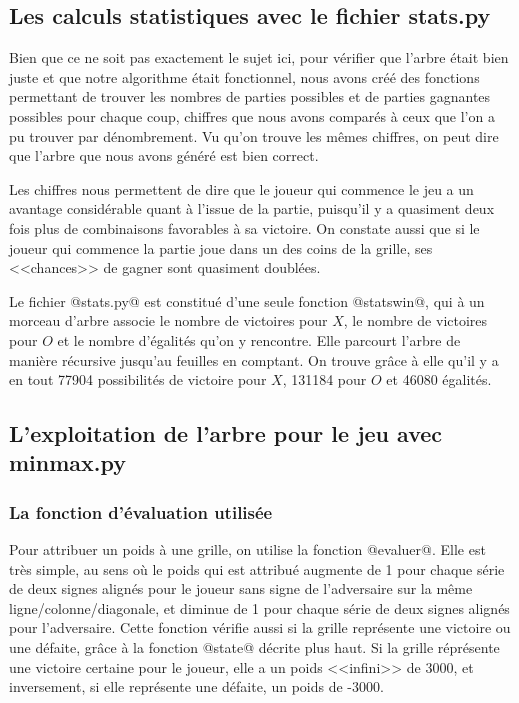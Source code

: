 \documentclass{article}
\begin{document}
\subsection{Les calculs statistiques avec le fichier stats.py}

Bien que ce ne soit pas exactement le sujet ici, pour vérifier que l'arbre était bien juste et que notre algorithme était fonctionnel, nous avons créé des fonctions permettant de trouver les nombres de parties possibles et de parties gagnantes possibles pour chaque coup, chiffres que nous avons comparés à ceux que l'on a pu trouver par dénombrement. Vu qu'on trouve les mêmes chiffres, on peut dire que l'arbre que nous avons généré est bien correct.

Les chiffres nous permettent de dire que le joueur qui commence le jeu a un avantage considérable quant à l'issue de la partie, puisqu'il y a quasiment deux fois plus de combinaisons favorables à sa victoire. On constate aussi que si le joueur qui commence la partie joue dans un des coins de la grille, ses <<chances>> de gagner sont quasiment doublées.

Le fichier @stats.py@ est constitué d'une seule fonction @statswin@, qui à un morceau d'arbre associe le nombre de victoires pour $X$, le nombre de victoires pour $O$ et le nombre d'égalités qu'on y rencontre. Elle parcourt l'arbre de manière récursive jusqu'au feuilles en comptant. On trouve grâce à elle qu'il y a en tout 77904 possibilités de victoire pour $X$, 131184 pour $O$ et 46080 égalités.

\subsection{L'exploitation de l'arbre pour le jeu avec minmax.py}

\subsubsection{La fonction d'évaluation utilisée}

Pour attribuer un poids à une grille, on utilise la fonction @evaluer@. Elle est très simple, au sens où le poids qui est attribué augmente de 1 pour chaque série de deux signes alignés pour le joueur sans signe de l'adversaire sur la même ligne/colonne/diagonale, et diminue de 1 pour chaque série de deux signes alignés pour l'adversaire. Cette fonction vérifie aussi si la grille représente une victoire ou une défaite, grâce à la fonction @state@ décrite plus haut. Si la grille réprésente une victoire certaine pour le joueur, elle a un poids <<infini>> de 3000, et inversement, si elle représente une défaite, un poids de -3000.
\end{document}
